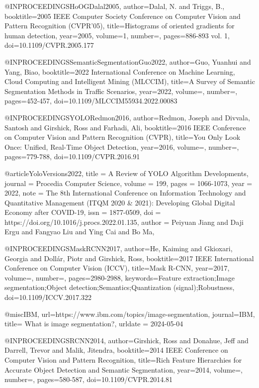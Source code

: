 @INPROCEEDINGS{HoOGDalal2005,
author={Dalal, N. and Triggs, B.},
booktitle={2005 IEEE Computer Society Conference on Computer Vision and Pattern Recognition (CVPR'05)},
title={Histograms of oriented gradients for human detection},
year={2005},
volume={1},
number={},
pages={886-893 vol. 1},
doi={10.1109/CVPR.2005.177}}

@INPROCEEDINGS{SemanticSegmentationGuo2022,
author={Guo, Yuanhui and Yang, Biao},
booktitle={2022 International Conference on Machine Learning, Cloud Computing and Intelligent Mining (MLCCIM)},
title={A Survey of Semantic Segmentation Methods in Traffic Scenarios},
year={2022},
volume={},
number={},
pages={452-457},
doi={10.1109/MLCCIM55934.2022.00083}}

@INPROCEEDINGS{YOLORedmon2016,
author={Redmon, Joseph and Divvala, Santosh and Girshick, Ross and Farhadi, Ali},
booktitle={2016 IEEE Conference on Computer Vision and Pattern Recognition (CVPR)},
title={You Only Look Once: Unified, Real-Time Object Detection},
year={2016},
volume={},
number={},
pages={779-788},
doi={10.1109/CVPR.2016.91}}

@article{YoloVersions2022,
title = {A Review of {YOLO} Algorithm Developments},
journal = {Procedia Computer Science},
volume = {199},
pages = {1066-1073},
year = {2022},
note = {The 8th International Conference on Information Technology and Quantitative Management (ITQM 2020 & 2021): Developing Global Digital Economy after COVID-19},
issn = {1877-0509},
doi = {https://doi.org/10.1016/j.procs.2022.01.135},
author = {Peiyuan Jiang and Daji Ergu and Fangyao Liu and Ying Cai and Bo Ma},
}

@INPROCEEDINGS{MaskRCNN2017,
author={He, Kaiming and Gkioxari, Georgia and Dollár, Piotr and Girshick, Ross},
booktitle={2017 IEEE International Conference on Computer Vision (ICCV)},
title={Mask {R-CNN}},
year={2017},
volume={},
number={},
pages={2980-2988},
keywords={Feature extraction;Image segmentation;Object detection;Semantics;Quantization (signal);Robustness},
doi={10.1109/ICCV.2017.322}}

@misc{IBM,
url={https://www.ibm.com/topics/image-segmentation},
journal={IBM},
title= {What is image segmentation?},
urldate = {2024-05-04}
}

@INPROCEEDINGS{RCNN2014,
author={Girshick, Ross and Donahue, Jeff and Darrell, Trevor and Malik, Jitendra},
booktitle={2014 IEEE Conference on Computer Vision and Pattern Recognition},
title={Rich Feature Hierarchies for Accurate Object Detection and Semantic Segmentation},
year={2014},
volume={},
number={},
pages={580-587},
doi={10.1109/CVPR.2014.81}}

